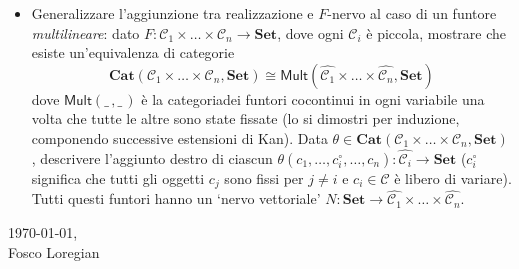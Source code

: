 \documentclass{amsart}
\def\Cat{\mathbf{Cat}}
\begin{document}
\begin{itemize}
\item Generalizzare l'aggiunzione tra realizzazione e $F$-nervo al caso di un funtore \emph{multilineare}: dato $F \colon \mathcal C_1 \times \dots \times \mathcal C_n \to \mathbf{Set}$, dove ogni  $\mathcal{C}_i$ è piccola, mostrare che esiste un'equivalenza di categorie
\[
\Cat(\mathcal{C}_1 \times \dots \times \mathcal{C}_n , \mathbf{Set}) \cong 
\textsf{Mult}(\widehat{\mathcal{C}_1}\times \dots \times \widehat{\mathcal{C}_n}, \mathbf{Set})
\]
dove $\textsf{Mult}(\_\, , \_\,)$ è la categoriadei funtori cocontinui in ogni variabile una volta che tutte le altre sono state fissate (lo si dimostri per induzione, componendo successive estensioni di Kan). Data $\theta \in \Cat(\mathcal{C}_1 \times \dots \times \mathcal{C}_n , \mathbf{Set})$, descrivere l'aggiunto destro di ciascun $\theta(c_1,\dots,c_i^\circ,\dots, c_n)\colon \widehat{\mathcal{C}_i} \to \mathbf{Set}$ ($c_i^\circ$ significa che tutti gli oggetti $c_j$ sono fissi per $j\neq i$ e $c_i\in\mathcal{C}$ è libero di variare). Tutti questi funtori hanno un `nervo vettoriale' $N\colon \mathbf{Set} \to \widehat{\mathcal{C}_1}\times \dots \times \widehat{\mathcal{C}_n}$.
\end{itemize}

\vspace{\fill}
\begin{flushright}
\today,\\
Fosco Loregian
\end{flushright}
\end{document}
